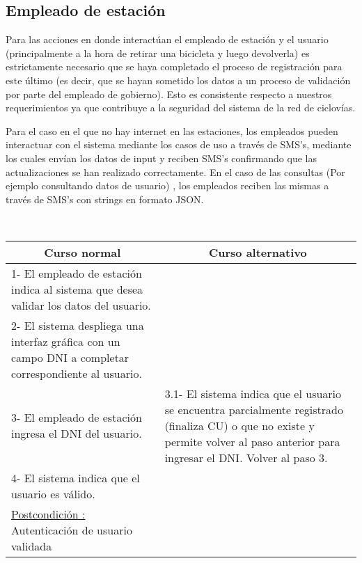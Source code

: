 \subsection{Empleado de estación}

Para las acciones en donde interactúan el empleado de estación y el usuario (principalmente a la hora de retirar una bicicleta
y luego devolverla)
es estrictamente necesario que se haya completado
el proceso de registración para este último (es decir, que se hayan sometido los datos a un proceso de validación por parte
del empleado de gobierno). Esto es consistente respecto a nuestros requerimientos ya que contribuye a la seguridad
del sistema de la red de ciclovías.

Para el caso en el que no hay internet en las estaciones, los empleados pueden interactuar con el sistema mediante
los casos de uso a través de SMS's, mediante los cuales envían los datos de input y reciben SMS's confirmando que
las actualizaciones se han realizado correctamente. 
En el caso de las consultas (Por ejemplo consultando datos de usuario)
, los empleados reciben las mismas a través de SMS's con strings en formato JSON.

~

\begin{center}
    \centering
    \begin{tabular}{ | p{11cm} | p{6cm} | }
    	\multicolumn{1}{c}{\cellcolor{black!30}\textbf{Curso normal}} & 
    	\multicolumn{1}{c}{\cellcolor{black!30}\textbf{Curso alternativo}} \\
		\hline
		1- El empleado de estación indica al sistema que desea validar los datos del usuario. &  \\ \hline
		2- El sistema despliega una interfaz gráfica con un campo DNI a completar correspondiente al usuario. &  \\ \hline
		3- El empleado de estación ingresa el DNI del usuario. &  
		3.1- El sistema indica que el usuario se encuentra parcialmente registrado (finaliza CU) o que no existe y permite volver al paso anterior para ingresar el DNI. Volver al paso 3. \\ \hline
		4- El sistema indica que el usuario es válido. & \\ \hline
		\underline{Postcondición :} Autenticación de usuario validada & \\ \hline
    \end{tabular}
\end{center}

